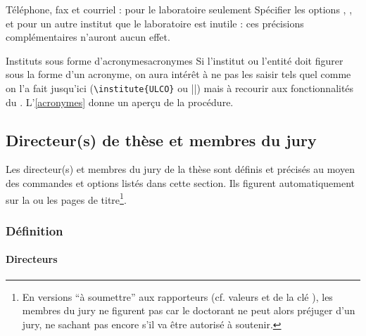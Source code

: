 %
\begin{dbremark}{Téléphone, fax et courriel : pour le
    laboratoire seulement}{}
  Spécifier les options , ,  et
   pour un autre institut que le laboratoire est inutile :
  ces précisions complémentaires n'auront aucun effet.
\end{dbremark}
%
\begin{dbremark}{Instituts sous forme d'acronymes}{acronymes}
  Si l'institut ou l'entité doit figurer sous la forme d'un acronyme, on aura
  intérêt à ne pas les saisir tels quel comme on l'a fait jusqu'ici
  (\lstinline[deletekeywords={[5]institute}]|\institute{ULCO}| ou
  ||) mais à recourir aux fonctionnalités du
  . L'\vref{acronymes} donne un aperçu de la procédure.
\end{dbremark}

\subsection{Directeur(s) de thèse et membres du jury}\label{sec-jury}

Les directeur(s) et membres du jury de la thèse sont définis et précisés au
moyen des commandes et options listés dans cette section. Ils figurent
automatiquement sur la ou les pages de titre\footnote{En versions \enquote{à
    soumettre} aux rapporteurs (cf. valeurs \protect{} et
  \protect{} de la clé \protect{}), les
  membres du jury ne figurent pas car le doctorant ne peut alors préjuger d'un
  jury, ne sachant pas encore s'il va être autorisé à soutenir.}.

\subsubsection{Définition}\label{sec-definition-directeurs-jury}

\paragraph{Directeurs}\label{sec-definition-directeurs}
%


